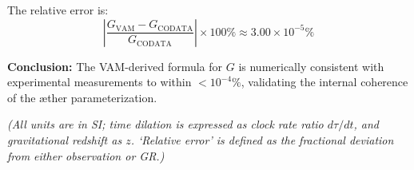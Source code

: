The relative error is:
\[
\left| \frac{G_\text{VAM} - G_\text{CODATA}}{G_\text{CODATA}} \right| \times 100\% \approx 3.00 \times 10^{-5}\%
\]

\noindent
\textbf{Conclusion:} The VAM-derived formula for \( G \) is numerically consistent with experimental measurements to within \( < 10^{-4}\% \), validating the internal coherence of the æther parameterization.

\textit{(All units are in SI; time dilation is expressed as clock rate ratio $d\tau/dt$, and gravitational redshift as $z$. ‘Relative error’ is defined as the fractional deviation from either observation or GR.)}


